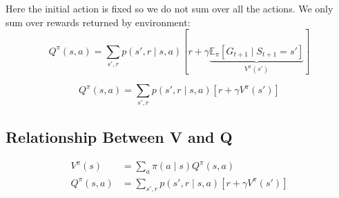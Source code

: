 \documentclass[12pt]{article}
\begin{document}
Here the initial action is fixed so we do not sum over all the actions. We only sum over rewards returned by environment:
\[
Q^\pi(s, a) = \sum_{s', r} p(s', r \mid s, a) \left[ r + \gamma \underbrace{\mathbb{E}_\pi [G_{t+1} \mid S_{t+1} = s']}_{V^\pi(s')} \right]
\]

\[
Q^\pi(s, a) = \sum_{s', r} p(s', r \mid s, a) \left[ r + \gamma V^\pi(s') \right]
\]

\subsection*{Relationship Between V and Q}
\begin{align*}
V^\pi(s) &= \sum_{a} \pi(a \mid s) Q^\pi(s, a) \\
Q^\pi(s, a) &= \sum_{s', r} p(s', r \mid s, a) \left[ r + \gamma V^\pi(s') \right]
\end{align*}
\end{document}

